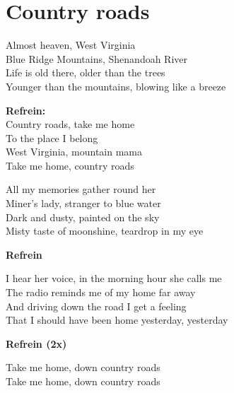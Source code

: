 \section{Country roads}
Almost heaven, West Virginia \\
Blue Ridge Mountains, Shenandoah River\\
Life is old there, older than the trees\\
Younger than the mountains, blowing like a breeze

\textbf{Refrein:}\\
Country roads, take me home\\
To the place I belong\\
West Virginia, mountain mama\\
Take me home, country roads

All my memories gather round her\\
Miner's lady, stranger to blue water\\
Dark and dusty, painted on the sky\\
Misty taste of moonshine, teardrop in my eye

\textbf{Refrein}

I hear her voice, in the morning hour she calls me\\
The radio reminds me of my home far away\\
And driving down the road I get a feeling\\
That I should have been home yesterday, yesterday

\textbf{Refrein (2x)}

Take me home, down country roads\\
Take me home, down country roads
